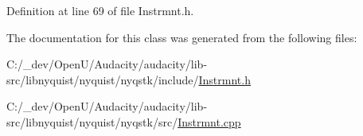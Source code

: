 Definition at line 69 of file Instrmnt.\+h.



The documentation for this class was generated from the following files\+:\begin{DoxyCompactItemize}
\item 
C\+:/\+\_\+dev/\+Open\+U/\+Audacity/audacity/lib-\/src/libnyquist/nyquist/nyqstk/include/\hyperlink{_instrmnt_8h}{Instrmnt.\+h}\item 
C\+:/\+\_\+dev/\+Open\+U/\+Audacity/audacity/lib-\/src/libnyquist/nyquist/nyqstk/src/\hyperlink{_instrmnt_8cpp}{Instrmnt.\+cpp}\end{DoxyCompactItemize}
